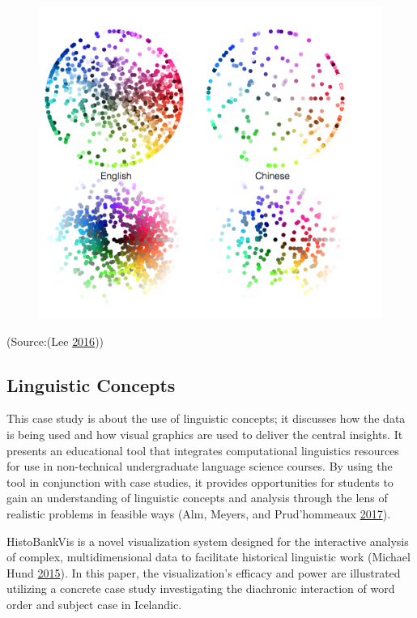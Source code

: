\documentclass[]{book}
\begin{document}
\begin{figure}
\centering
\includegraphics{images/colorwords.png}
\caption{}
\end{figure}

(Source:(Lee \protect\hyperlink{ref-green_honey}{2016}))

\subsection{Linguistic Concepts}\label{linguistic-concepts}

This case study is about the use of linguistic concepts; it discusses
how the data is being used and how visual graphics are used to deliver
the central insights. It presents an educational tool that integrates
computational linguistics resources for use in non-technical
undergraduate language science courses. By using the tool in conjunction
with case studies, it provides opportunities for students to gain an
understanding of linguistic concepts and analysis through the lens of
realistic problems in feasible ways (Alm, Meyers, and Prud'hommeaux
\protect\hyperlink{ref-lingui_data}{2017}).

HistoBankVis is a novel visualization system designed for the
interactive analysis of complex, multidimensional data to facilitate
historical linguistic work (Michael Hund
\protect\hyperlink{ref-lingui_data1}{2015}). In this paper, the
visualization's efficacy and power are illustrated utilizing a concrete
case study investigating the diachronic interaction of word order and
subject case in Icelandic.
\end{document}
